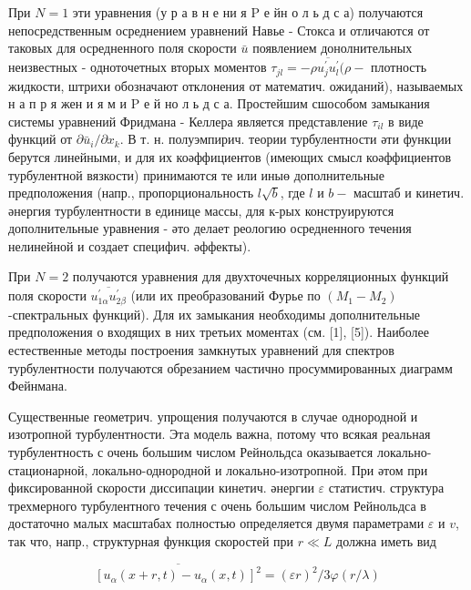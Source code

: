 \documentclass[10pt]{article}
\begin{document}
При $N=1$ эти уравнения (у р а в н е ни я $\mathrm{P}$ е йн о л ь д с а) получаются непосредственным осреднением уравнений Навье - Стокса и отличаются от таковых для осредненного поля скорости $\bar{u}$ появлением донолнительных неизвестных - одноточетных вторых моментов $\tau_{j l}=-\rho \overline{u_{j}^{\prime} u_{l}^{\prime}}(\rho-$ плотность жидкости, штрихи обозначают отклонения от математич. ожиданий), называемых н а п р я жен и я м и $\mathrm{P}$ е й но л ь д с а. Простейшим сшособом замыкания системы уравнений Фридмана - Келлера является представление $\tau_{i l}$ в виде функций от $\partial \bar{u}_{i} / \partial x_{k}$. В т. н. полуэмпирич. теории турбулентности әти функции берутся линейными, и для их коәффициентов (имеющих смысл коәффициентов турбулентной вязкости) принимаются те или иныө дополнительные предположения (напр., пропорциональность $l \sqrt{b}$, где $l$ и $b-$ масштаб и кинетич. әнергия турбулентности в единице массы, для к-рых конструируются дополнительные уравнения - әто делает реологию осредненного течения нелинейной и создает специфич. әффекты).



При $N=2$ получаются уравнения для двухточечных корреляционных функций поля скорости $\overline{u_{1 \alpha}^{\prime} u_{2 \beta}^{\prime}}$ (или их преобразований Фурье по $\left(M_{1}-M_{2}\right)$-спектральных функций). Для их замыкания необходимы дополнительные предположения о входящих в них третьих моментах (см. [1], [5]). Наиболее естественные методы построения замкнутых уравнений для спектров турбулентности получаются обрезанием частично просуммированных диаграмм Фейнмана.



Существенные геометрич. упрощения получаются в случае однородной и изотропной турбулентности. Эта модель важна, потому что всякая реальная турбулентность с очень большим числом Рейнольдса оказывается локально-стационарной, локально-однородной и локально-изотропной. При әтом при фиксированной скорости диссипации кинетич. әнергии $\varepsilon$ статистич. структура трехмерного турбулентного течения с очень большим числом Рейнольдса в достаточно малых масштабах полностью определяется двумя параметрами $\varepsilon$ и $v$, так что, напр., структурная функция скоростей при $r \ll L$ должна иметь вид



\[

\overline{\left[u_{\alpha}(x+r, t)-u_{\alpha}(x, t)\right]^{2}}=(\varepsilon r)^{2} / 3 \varphi(r / \lambda)

\]
\end{document}
